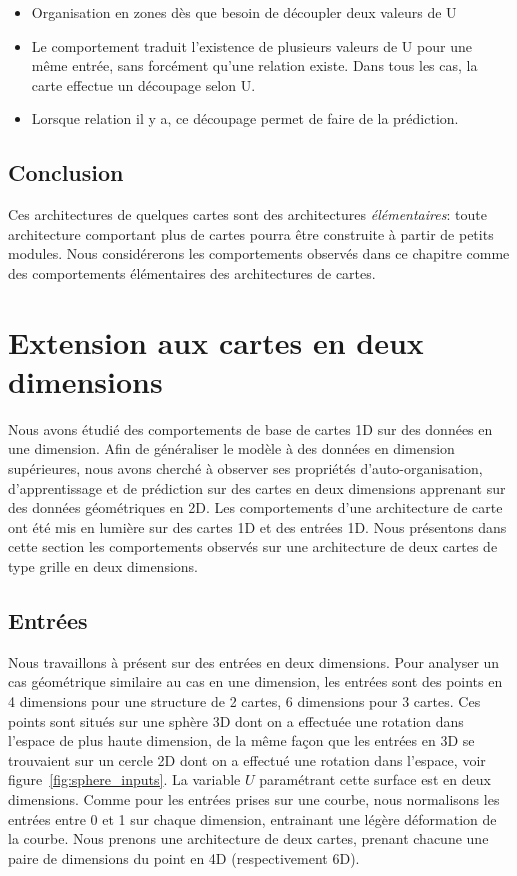 \documentclass[../main]{subfiles}
\begin{document}
\begin{itemize}
	\item Organisation en zones dès que besoin de découpler deux valeurs de U
	\item Le comportement traduit l'existence de plusieurs valeurs de U pour une même entrée, sans forcément qu'une relation existe. Dans tous les cas, la carte effectue un découpage selon U.
	\item Lorsque relation il y a, ce découpage permet de faire de la prédiction.
\end{itemize}

\subsection{Conclusion}

Ces architectures de quelques cartes sont des architectures \emph{élémentaires}: toute architecture comportant plus de cartes pourra être construite à partir de petits modules. Nous considérerons les comportements observés dans ce chapitre comme des comportements élémentaires des architectures de cartes.


\section{Extension aux cartes en deux dimensions}

Nous avons étudié des comportements de base de cartes 1D sur des données en une dimension. Afin de généraliser le modèle à des données en dimension supérieures, nous avons cherché à observer ses propriétés d'auto-organisation, d'apprentissage et de prédiction sur des cartes en deux dimensions apprenant sur des données géométriques en 2D.
Les comportements d'une architecture de carte ont été mis en lumière sur des cartes 1D et des entrées 1D. Nous présentons dans cette section les comportements observés sur une architecture de deux cartes de type grille en deux dimensions. 

\subsection{Entrées}

Nous travaillons à présent sur des entrées en deux dimensions. Pour analyser un cas géométrique similaire au cas en une dimension, les entrées sont des points en 4 dimensions pour une structure de 2 cartes, 6 dimensions pour 3 cartes. Ces points sont situés sur une sphère 3D dont on a effectuée une rotation dans l'espace de plus haute dimension, de la même façon que les entrées en 3D se trouvaient sur un cercle 2D dont on a effectué une rotation dans l'espace, voir figure~\ref{fig:sphere_inputs}. La variable $U$ paramétrant cette surface est en deux dimensions.
Comme pour les entrées prises sur une courbe, nous normalisons les entrées entre 0 et 1 sur chaque dimension, entrainant une légère déformation de la courbe.
Nous prenons une architecture de deux cartes, prenant chacune une paire de dimensions du point en 4D (respectivement 6D).
\end{document}
